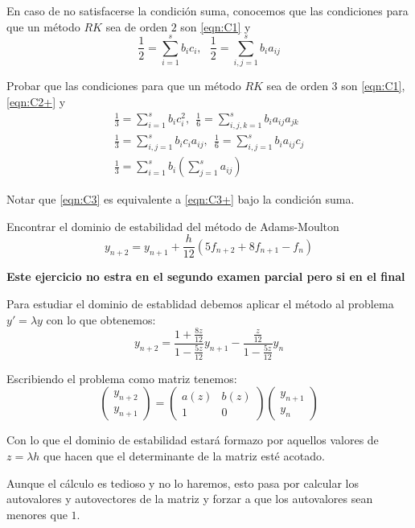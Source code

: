 \begin{problem}[2]
En caso de no satisfacerse la condición suma, conocemos que las condiciones para que un método $RK$ sea de orden $2$ son \ref{eqn:C1} y
\begin{equation}
\tag{C2+}
\frac{1}{2}=\sum_{i=1}^sb_ic_i, \ \ \ \frac{1}{2} = \sum_{i,j=1}^sb_ia_{ij}
\label{eqn:C2+}
\end{equation}

Probar que las condiciones para que un método $RK$ sea de orden $3$ son \ref{eqn:C1}, \ref{eqn:C2+} y
\begin{equation}
\tag{C3+}
\begin{split}
\frac{1}{3} = \sum_{i=1}^sb_ic_i^2, \ \ \frac{1}{6}=\sum_{i,j,k=1}^sb_ia_{ij}a_{jk}\\
\frac{1}{3} = \sum_{i,j=1}^sb_ic_ia_{ij}, \ \ \frac{1}{6}=\sum_{i,j=1}^sb_ia_{ij}c_j \\
\frac{1}{3}=\sum_{i=1}^sb_i\left(\sum_{j=1}^sa_{ij} \right)
\end{split}
\label{eqn:C3+}
\end{equation}

Notar que \ref{eqn:C3} es equivalente a \ref{eqn:C3+} bajo la condición suma.
\solution

\end{problem}

\begin{problem}[3]
Encontrar el dominio de estabilidad del método de Adams-Moulton
\[y_{n+2}=y_{n+1}+\frac{h}{12}(5f_{n+2}+8f_{n+1}-f_n)\]
\solution

\textbf{Este ejercicio no estra en el segundo examen parcial pero si en el final}

Para estudiar el dominio de establidad debemos aplicar el método al problema $y'=λy$ con lo que obtenemos:
\[y_{n+2}=\frac{1+\frac{8z}{12}}{1-\frac{5z}{12}}y_{n+1} - \frac{\frac{z}{12}}{1-\frac{5z}{12}}y_{n}\]

Escribiendo el problema como matriz tenemos:
\[\left(\begin{array}{c} y_{n+2} \\ y_{n+1}\end{array} \right) = \left(\begin{array}{cc} a(z) & b(z) \\ 1 & 0\end{array} \right)\left(\begin{array}{c} y_{n+1} \\ y_{n}\end{array} \right)\]

Con lo que el dominio de estabilidad estará formazo por aquellos valores de $z=λh$ que hacen que el determinante de la matriz esté acotado.

Aunque el cálculo es tedioso y no lo haremos, esto pasa por calcular los autovalores y autovectores de la matriz y forzar a que los autovalores sean menores que $1$.

\end{problem}

